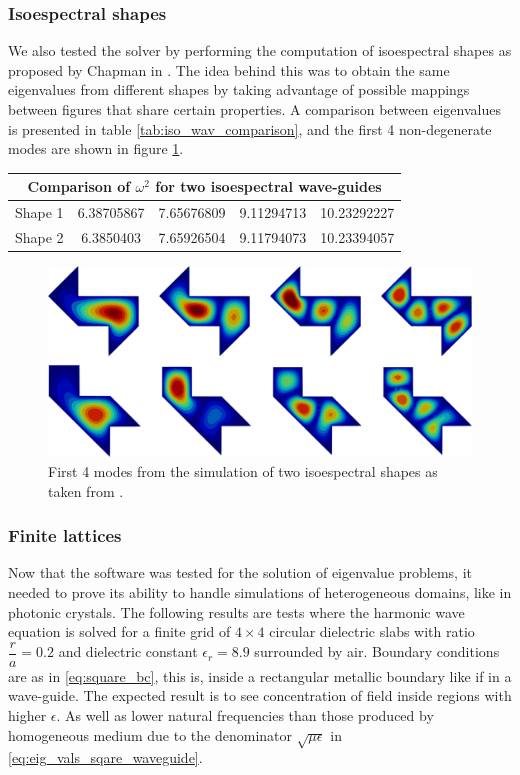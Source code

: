 \subsubsection{Isoespectral shapes}
We also tested the solver by performing the computation of isoespectral shapes as proposed by Chapman in \cite{Chapman1995}. The idea behind this was to obtain the same eigenvalues from different shapes by taking advantage of possible mappings between figures that share certain properties.
A comparison between eigenvalues is presented in table \ref{tab:iso_wav_comparison}, and the first 4 non-degenerate modes are shown in figure \ref{fig:isoespectral_waveguide}.
\begin{center}
\begin{tabular}{|c|c|c|c|c|}
\hline
\multicolumn{5}{|c|}{Comparison of $\omega^2$ for two isoespectral wave-guides} \\
\hline 
Shape 1  & 6.38705867 & 7.65676809 & 9.11294713 & 10.23292227 \\ 
\hline 
Shape 2 & 6.3850403 & 7.65926504 & 9.11794073 & 10.23394057 \\ 
\hline 
\end{tabular}
\label{tab:iso_wav_comparison}
\end{center}
\begin{figure}
\centering
\includegraphics[scale=0.1]{./img/isoespectral.pdf}
\caption{First 4 modes from the simulation of two isoespectral shapes as taken from \cite{Chapman1995}.}
\label{fig:isoespectral_waveguide}
\end{figure}

\subsubsection{Finite lattices}

Now that the software was tested for the solution of eigenvalue problems, it needed to prove its ability to handle simulations of heterogeneous domains, like in photonic crystals. The following results are tests where the harmonic wave equation is solved for a finite grid of $4\times 4$ circular dielectric slabs with ratio $\dfrac{r}{a}=0.2$ and dielectric constant $\epsilon_r = 8.9$ surrounded by air. Boundary conditions are as in \ref{eq:square_bc}, this is, inside a rectangular metallic boundary like if in a wave-guide. The expected result is to see concentration of field inside regions with higher $\epsilon$. As well as lower natural frequencies than those produced by homogeneous medium due to the denominator $\sqrt{\mu\epsilon}$ in \ref{eq:eig_vals_sqare_waveguide}. 

